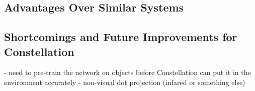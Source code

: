 \subsection{Advantages Over Similar Systems}
\subsection{Shortcomings and Future Improvements for Constellation}
- need to pre-train the network on objects before Constellation can put it in the environment accurately
- non-visual dot projection (infared or something else)